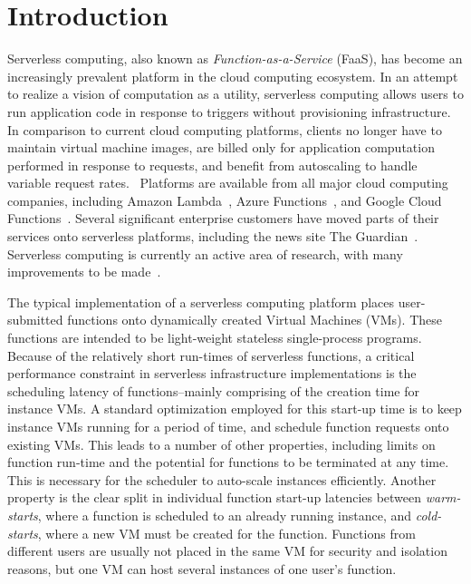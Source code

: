 \section{Introduction} \label{sec:intro}

 Serverless computing, also known as
\emph{Function-as-a-Service} (FaaS), has become an increasingly prevalent
platform in the cloud computing ecosystem. In an attempt to realize a vision of
computation as a utility, serverless computing allows users to run application
code in response to triggers without provisioning infrastructure. In comparison
to current cloud computing platforms, clients no longer have to maintain virtual
machine images, are billed only for application computation performed in
response to requests, and benefit from autoscaling to handle variable request
rates.~\cite{berkely-serverless} Platforms are available from all major cloud
computing companies, including Amazon Lambda~\cite{lambda}, Azure
Functions~\cite{azure-cf}, and Google Cloud Functions~\cite{gcf}. Several
significant enterprise customers have moved parts of their services onto
serverless platforms, including the news site The Guardian~\cite{guardian}.
Serverless computing is currently an active area of research, with many
improvements to be made~\cite{peeking}\cite{trilemma}\cite{steps-back}.

 The typical implementation of a
serverless computing platform places user-submitted functions onto dynamically
created Virtual Machines (VMs). These functions are intended to be light-weight
stateless single-process programs. Because of the relatively short run-times of
serverless functions, a critical performance constraint in serverless
infrastructure implementations is the scheduling latency of functions--mainly
comprising of the creation time for instance VMs. A standard optimization
employed for this start-up time is to keep instance VMs running for a period of
time, and schedule function requests onto existing VMs. This leads to a number
of other properties, including limits on function run-time and the potential
for functions to be terminated at any time. This is necessary for the scheduler
to auto-scale instances efficiently. Another property is the clear split in
individual function start-up latencies between \emph{warm-starts}, where a function
is scheduled to an already running instance, and \emph{cold-starts}, where a new VM
must be created for the function. Functions from different users are usually
not placed in the same VM for security and isolation reasons, but one VM can
host several instances of one user's function.

